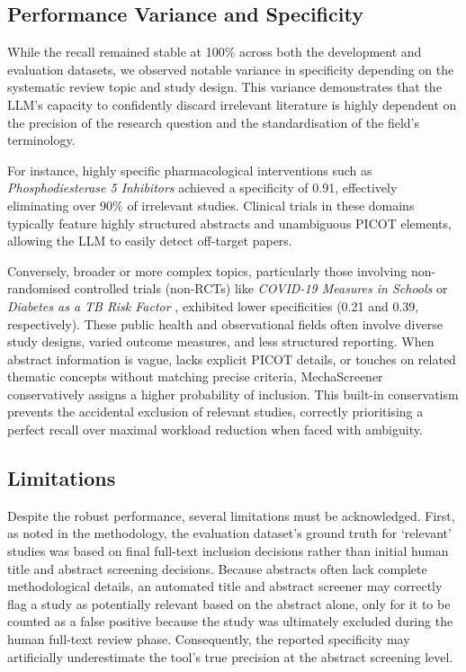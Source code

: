 \documentclass[11pt,a4paper]{article}
\begin{document}
\subsection{Performance Variance and Specificity}
While the recall remained stable at 100\% across both the development and evaluation datasets, we observed notable variance in specificity depending on the systematic review topic and study design. This variance demonstrates that the LLM's capacity to confidently discard irrelevant literature is highly dependent on the precision of the research question and the standardisation of the field's terminology.

For instance, highly specific pharmacological interventions such as \textit{Phosphodiesterase 5 Inhibitors} \cite{phosphodiestrase_5_inhibitors} achieved a specificity of 0.91, effectively eliminating over 90\% of irrelevant studies. Clinical trials in these domains typically feature highly structured abstracts and unambiguous PICOT elements, allowing the LLM to easily detect off-target papers.

Conversely, broader or more complex topics, particularly those involving non-randomised controlled trials (non-RCTs) like \textit{COVID-19 Measures in Schools} \cite{non_rct_covid_schools} or \textit{Diabetes as a TB Risk Factor} \cite{non_rct_diabetes_tb}, exhibited lower specificities (0.21 and 0.39, respectively). These public health and observational fields often involve diverse study designs, varied outcome measures, and less structured reporting. When abstract information is vague, lacks explicit PICOT details, or touches on related thematic concepts without matching precise criteria, MechaScreener conservatively assigns a higher probability of inclusion. This built-in conservatism prevents the accidental exclusion of relevant studies, correctly prioritising a perfect recall over maximal workload reduction when faced with ambiguity.

\subsection{Limitations}
Despite the robust performance, several limitations must be acknowledged. First, as noted in the methodology, the evaluation dataset's ground truth for `relevant' studies was based on final full-text inclusion decisions rather than initial human title and abstract screening decisions. Because abstracts often lack complete methodological details, an automated title and abstract screener may correctly flag a study as potentially relevant based on the abstract alone, only for it to be counted as a false positive because the study was ultimately excluded during the human full-text review phase. Consequently, the reported specificity may artificially underestimate the tool's true precision at the abstract screening level.
\end{document}
